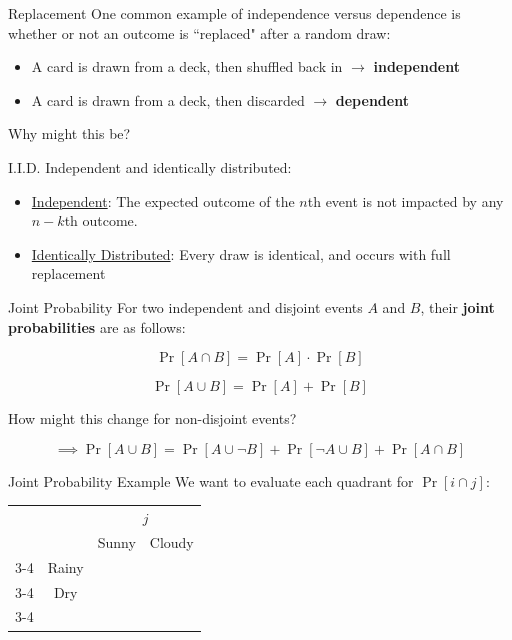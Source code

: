 \documentclass[10pt]{beamer}
\begin{document}
\begin{frame}{Replacement}
    One common example of independence versus dependence is whether or not an outcome is ``replaced" after a random draw:

    \begin{itemize}
        \item A card is drawn from a deck, then shuffled back in $\rightarrow$ \textbf{independent}
        \item A card is drawn from a deck, then discarded $\rightarrow$ \textbf{dependent}
    \end{itemize}
\vspace{.5cm}
    Why might this be?
\end{frame}

\begin{frame}{I.I.D.}
    Independent and identically distributed:

\begin{itemize}
    \item \underline{Independent}: The expected outcome of the $n$th event is not impacted by any $n-k$th outcome.
    \item \underline{Identically Distributed}: Every draw is identical, and occurs with full replacement
\end{itemize}
\end{frame}




\begin{frame}{Joint Probability}
    For two independent and disjoint events $A$ and $B$, their \textbf{joint probabilities} are as follows:

    \[\Pr[A \cap B] = \Pr[A] \cdot \Pr[B]\]

    \[\Pr[A \cup B] = \Pr[A] + \Pr[B]\]

    How might this change for non-disjoint events? \pause

    \[\implies \Pr[A \cup B] = \Pr[A \cup \neg B] + \Pr[\neg A \cup B] + \Pr[A \cap B]\]
    
\end{frame}

\begin{frame}{Joint Probability Example}
We want to evaluate each quadrant for $\Pr[i \cap j]$:
    \begin{table}[H]
\centering
\renewcommand{\arraystretch}{1.5} %
\setlength{\tabcolsep}{12pt} %
\begin{tabular}{cccc}
                    &                        & \multicolumn{2}{c}{$j$}                              \\
                    &                        & Sunny                        & Cloudy                        \\ \cline{3-4} 
\multirow{1}{*}{$i$} & \multicolumn{1}{c|}{Rainy} & \multicolumn{1}{c|}{} & \multicolumn{1}{c|}{} \\ \cline{3-4} 
                    & \multicolumn{1}{c|}{Dry} & \multicolumn{1}{c|}{} & \multicolumn{1}{c|}{} \\ \cline{3-4} 
\end{tabular}
\end{table}
\end{frame}
\end{document}
